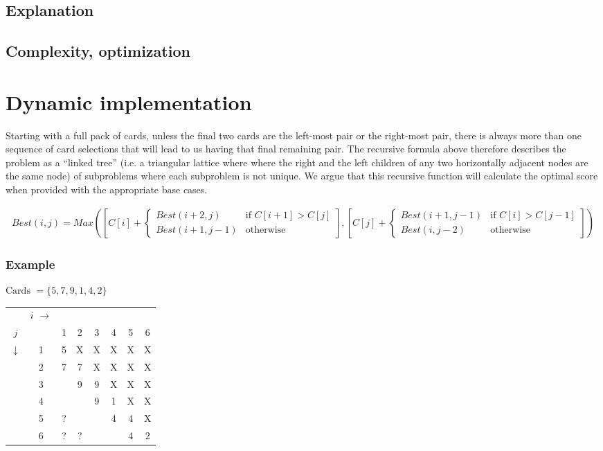 \documentclass[11pt]{article}
\begin{document}
\subsection{Explanation}
\subsection{Complexity, optimization}

\section{Dynamic implementation}
Starting with a full pack of cards, unless the final two cards are the left-most pair or the right-most pair, there is always more than one sequence of card selections that will lead to us having that final remaining pair. The recursive formula above therefore describes the problem as a ``linked tree'' (i.e. a triangular lattice where where the right and the left children of any two horizontally adjacent nodes are the same node) of subproblems where each subproblem is not unique. We argue that this recursive function will calculate the optimal score when provided with the appropriate base cases.


\footnotesize
\begin{align*}
	Best(i, j) = Max\left( 
	\left[C[i] +
	\begin{cases}
		Best(i+2,j) & \text{if $C[i+1] > C[j]$} \\
		Best(i+1,j-1) & \text{otherwise}
	\end{cases}
	\right]
	,
	\left[
	C[j] +
	\begin{cases}
		Best(i+1,j-1) & \text{if $C[i] > C[j-1]$} \\
		Best(i,j-2) & \text{otherwise}
	\end{cases}
\right]
	\right)
\end{align*}
\normalsize

\subsubsection*{Example}
	$\text{Cards } = \{5,7,9,1,4,2\}$

	\begin{tabular}[c]{cc|cccccc}
		& $i$ $\rightarrow$\\

		$j$          &   & 1 & 2 & 3 & 4 & 5 & 6 \\
		             \cline{2-8}
		$\downarrow$ & 1 & 5 & X & X & X & X & X \\
		             & 2 & 7 & 7 & X & X & X & X \\
		             & 3 &   & 9 & 9 & X & X & X \\
		             & 4 &   &   & 9 & 1 & X & X \\
		             & 5 & ? &   &   & 4 & 4 & X \\
		             & 6 & ? & ? &   &   & 4 & 2
		
	\end{tabular}
\end{document}
